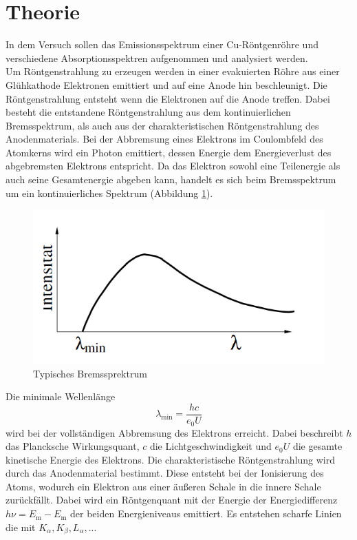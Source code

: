 \section{Theorie}
\label{sec:Theorie}
In dem Versuch sollen das Emissionsspektrum einer Cu-Röntgenröhre und verschiedene Absorptionsspektren aufgenommen und analysiert werden.
\\
Um Röntgenstrahlung zu erzeugen werden in einer evakuierten Röhre aus einer Glühkathode Elektronen emittiert und auf eine Anode hin beschleunigt. 
Die Röntgenstrahlung entsteht wenn die Elektronen auf die Anode treffen. Dabei besteht die entstandene Röntgenstrahlung aus dem kontinuierlichen
 Bremsspektrum, als auch aus der charakteristischen Röntgenstrahlung des Anodenmaterials. 
 Bei der Abbremsung eines Elektrons im Coulombfeld des Atomkerns wird ein Photon emittiert, dessen Energie dem Energieverlust des abgebremsten Elektrons entspricht.
 Da das Elektron sowohl eine Teilenergie als auch seine Gesamtenergie abgeben kann, handelt es sich beim Bremsspektrum um ein kontinuierliches Spektrum (Abbildung \ref{fig:Brems}).
 \begin{figure}
    \centering
    \caption{Typisches Bremssprektrum \cite{}}
    \label{fig:Brems}
    \includegraphics[width = 0.6 \textwidth]{pics/Bremsspe.png}
\end{figure}
 Die minimale Wellenlänge 
 \begin{equation}
     \lambda_\text{min}=\frac{h c}{e_0 U}
     \label{eqn:lammin}
 \end{equation}
 wird bei der vollständigen Abbremsung des Elektrons erreicht.
 Dabei beschreibt $h$ das Plancksche Wirkungsquant, $c$ die Lichtgeschwindigkeit und $e_0 U$ die gesamte kinetische Energie des Elektrons.
 Die charakteristische Röntgenstrahlung wird durch das Anodenmaterial bestimmt. Diese entsteht bei der Ionisierung des Atoms, wodurch ein Elektron aus einer äußeren Schale in die innere Schale zurückfällt.
 Dabei wird ein Röntgenquant mit der Energie der Energiedifferenz $h \nu = E_\text{m}-E_\text{m}$ der beiden Energieniveaus emittiert. Es entstehen scharfe Linien die mit $K_\alpha, K_\beta, L_\alpha, ...$ 
